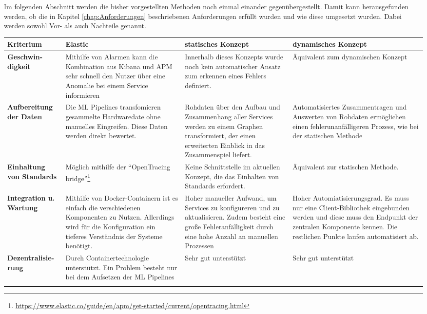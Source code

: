 Im folgenden Abschnitt werden die bisher vorgestellten Methoden noch einmal einander gegenübergestellt. Damit kann herausgefunden werden, ob die in Kapitel \vref{chap:Anforderungen} beschriebenen Anforderungen erfüllt wurden und wie diese umgesetzt wurden. Dabei werden sowohl Vor- als auch Nachteile genannt. 

\clearpage

\begin{tabularx}{\textwidth}{s|X|X|X}
	\textbf{Kriterium} & \textbf{Elastic} & \textbf{statisches Konzept} & \textbf{dynamisches Konzept}\\
	\hline
	\textbf{Geschwin-digkeit} & Mithilfe von Alarmen kann die Kombination aus Kibana und APM sehr schnell den Nutzer über eine Anomalie bei einem Service informieren & Innerhalb dieses Konzepts wurde noch kein automatischer Ansatz zum erkennen eines Fehlers definiert. & Äquivalent zum dynamischen Konzept \\
	\hline
	\textbf{Aufbereitung der Daten} & Die \ac{ML} Pipelines transfomieren gesammelte Hardwaredate ohne manuelles Eingreifen. Diese Daten werden direkt bewertet. & Rohdaten über den Aufbau und Zusammenhang aller Services werden zu einem Graphen transformiert, der einen erweiterten Einblick in das Zusammenspiel liefert. & Automatisiertes Zusammentragen und Auswerten von Rohdaten ermöglichen einen fehlerunanfälligeren Prozess, wie bei der statischen Methode \\
	\hline
	\textbf{Einhaltung von Standards} & Möglich mithilfe der \enquote{OpenTracing bridge}\footnote{\url{https://www.elastic.co/guide/en/apm/get-started/current/opentracing.html}} & Keine Schnittstelle im aktuellen Konzept, die das Einhalten von Standards erfordert. & Äquivalent zur statischen Methode. \\
	\hline
	\textbf{Integration u. Wartung} & Mithilfe von Docker-Containern ist es einfach die verschiedenen Komponenten zu Nutzen. Allerdings wird für die Konfiguration ein tieferes Verständnis der Systeme benötigt. & Hoher manueller Aufwand, um Services zu konfigureren und zu aktualisieren. Zudem besteht eine große Fehleranfälligkeit durch eine hohe Anzahl an manuellen Prozessen & Hoher Automiatisierungsgrad. Es muss nur eine Client-Bibliothek eingebunden werden und diese muss den Endpunkt der zentralen Komponente kennen. Die restlichen Punkte laufen automatisiert ab. \\
	\hline
	\textbf{Dezentralisie-rung} & Durch Containertechnologie unterstützt. Ein Problem besteht nur bei dem Aufsetzen der \ac{ML} Pipelines & Sehr gut unterstützt & Sehr gut unterstützt \\
	\bottomrule
	\caption{Gegenüberstellung der verschiedenen Konzepte}
	\label{tab:Vergleich}
\end{tabularx}
